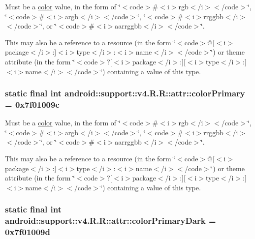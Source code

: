 Must be a \hyperlink{classandroid_1_1support_1_1v4_1_1_r_1_1color}{color} value, in the form of \char`\"{}$<$code$>$\#$<$i$>$rgb$<$/i$>$$<$/code$>$\char`\"{}, \char`\"{}$<$code$>$\#$<$i$>$argb$<$/i$>$$<$/code$>$\char`\"{}, \char`\"{}$<$code$>$\#$<$i$>$rrggbb$<$/i$>$$<$/code$>$\char`\"{}, or \char`\"{}$<$code$>$\#$<$i$>$aarrggbb$<$/i$>$$<$/code$>$\char`\"{}. 

This may also be a reference to a resource (in the form \char`\"{}$<$code$>$@\mbox{[}$<$i$>$package$<$/i$>$:\mbox{]}$<$i$>$type$<$/i$>$:$<$i$>$name$<$/i$>$$<$/code$>$\char`\"{}) or theme attribute (in the form \char`\"{}$<$code$>$?\mbox{[}$<$i$>$package$<$/i$>$:\mbox{]}\mbox{[}$<$i$>$type$<$/i$>$:\mbox{]}$<$i$>$name$<$/i$>$$<$/code$>$\char`\"{}) containing a value of this type. \hypertarget{classandroid_1_1support_1_1v4_1_1_r_1_1attr_720dbb9e1017e3b43a9438d082ecdaed}{
\subsubsection[{colorPrimary}]{\setlength{\rightskip}{0pt plus 5cm}static final int android::support::v4.R.R::attr::colorPrimary = 0x7f01009c}}
\label{classandroid_1_1support_1_1v4_1_1_r_1_1attr_720dbb9e1017e3b43a9438d082ecdaed}


Must be a \hyperlink{classandroid_1_1support_1_1v4_1_1_r_1_1color}{color} value, in the form of \char`\"{}$<$code$>$\#$<$i$>$rgb$<$/i$>$$<$/code$>$\char`\"{}, \char`\"{}$<$code$>$\#$<$i$>$argb$<$/i$>$$<$/code$>$\char`\"{}, \char`\"{}$<$code$>$\#$<$i$>$rrggbb$<$/i$>$$<$/code$>$\char`\"{}, or \char`\"{}$<$code$>$\#$<$i$>$aarrggbb$<$/i$>$$<$/code$>$\char`\"{}. 

This may also be a reference to a resource (in the form \char`\"{}$<$code$>$@\mbox{[}$<$i$>$package$<$/i$>$:\mbox{]}$<$i$>$type$<$/i$>$:$<$i$>$name$<$/i$>$$<$/code$>$\char`\"{}) or theme attribute (in the form \char`\"{}$<$code$>$?\mbox{[}$<$i$>$package$<$/i$>$:\mbox{]}\mbox{[}$<$i$>$type$<$/i$>$:\mbox{]}$<$i$>$name$<$/i$>$$<$/code$>$\char`\"{}) containing a value of this type. \hypertarget{classandroid_1_1support_1_1v4_1_1_r_1_1attr_513eacc74e2b14f1905e070493fe4910}{
\subsubsection[{colorPrimaryDark}]{\setlength{\rightskip}{0pt plus 5cm}static final int android::support::v4.R.R::attr::colorPrimaryDark = 0x7f01009d}}
\label{classandroid_1_1support_1_1v4_1_1_r_1_1attr_513eacc74e2b14f1905e070493fe4910}


